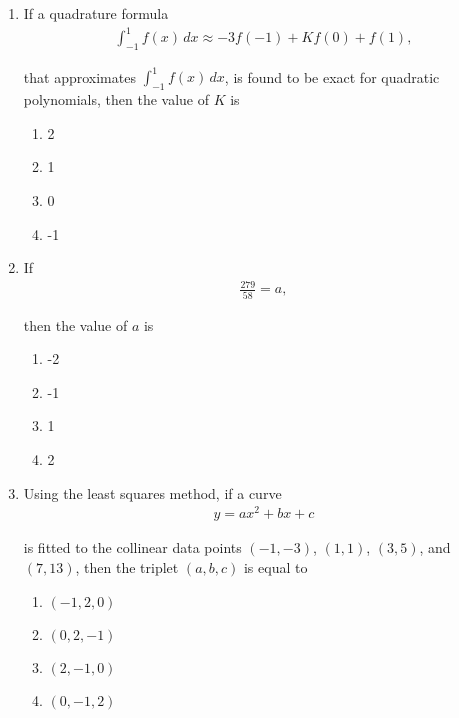 \documentclass[journal]{IEEEtran}
\numberwithin{equation}{enumi}
\numberwithin{figure}{enumi}
\begin{document}
\begin{enumerate}
\item
If a quadrature formula 
\begin{align}
    \int_{-1}^1 f(x) \, dx \approx -3 f(-1) + K f(0) + f(1),
\end{align}

that approximates $\int_{-1}^1 f(x) \, dx$, is found to be exact for quadratic polynomials, then the value of $K$ is
\hfill{}
\begin{multicols}{4}
\begin{enumerate}
    \item 2
    \item 1
    \item 0
    \item -1
\end{enumerate}
\end{multicols}

\item
If
\begin{align}
    \frac{279}{58} = a,
\end{align}

then the value of $a$ is
\hfill{}
\begin{multicols}{4}
\begin{enumerate}
    \item -2
    \item -1
    \item 1
    \item 2
\end{enumerate}
\end{multicols}

\item
Using the least squares method, if a curve 
\begin{align}
    y = a x^2 + b x + c
\end{align}

is fitted to the collinear data points $(-1,-3)$, $(1,1)$, $(3,5)$, and $(7,13)$, then the triplet $(a,b,c)$ is equal to
\hfill{}
\begin{multicols}{4}
\begin{enumerate}
    \item $(-1, 2, 0)$
    \item $(0, 2, -1)$
    \item $(2, -1, 0)$
    \item $(0, -1, 2)$
\end{enumerate}
\end{multicols}


\end{enumerate}
\end{document}
